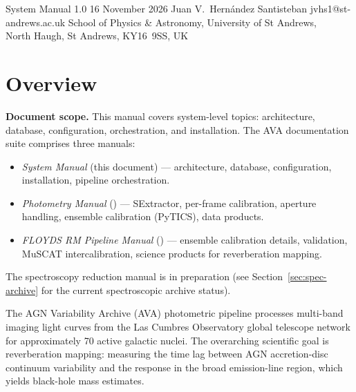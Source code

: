 \documentclass[12pt,a4paper]{article}
\begin{document}

\avatitlepage
  {System Manual}
  {1.0}
  {16 November 2026}
  {Juan V.\ Hern\'{a}ndez Santisteban}
  {jvhs1@st-andrews.ac.uk}
  {School of Physics \& Astronomy, University of St Andrews,\\
   North Haugh, St Andrews, KY16~9SS, UK}

\tableofcontents
\clearpage


\section{Overview}

\begin{notebox}
\textbf{Document scope.}  This manual covers system-level topics:
architecture, database, configuration, orchestration, and installation.
The AVA documentation suite comprises three manuals:
\begin{itemize}[noitemsep]
  \item \emph{System Manual} (this document) --- architecture, database,
        configuration, installation, pipeline orchestration.
  \item \emph{Photometry Manual} () ---
        SExtractor, per-frame calibration, aperture handling, ensemble
        calibration (PyTICS), data products.
  \item \emph{FLOYDS RM Pipeline Manual} () ---
        ensemble calibration details, validation, MuSCAT intercalibration,
        science products for reverberation mapping.
\end{itemize}
The spectroscopy reduction manual is in preparation (see
Section~\ref{sec:spec-archive} for the current spectroscopic archive status).
\end{notebox}

\label{sec:overview}

The AGN Variability Archive (AVA) photometric pipeline processes multi-band imaging light
curves from the Las Cumbres Observatory global telescope network for approximately 70 active
galactic nuclei.  The overarching scientific goal is reverberation mapping: measuring the
time lag between AGN accretion-disc continuum variability and the response in the broad
emission-line region, which yields black-hole mass estimates.
\end{document}
